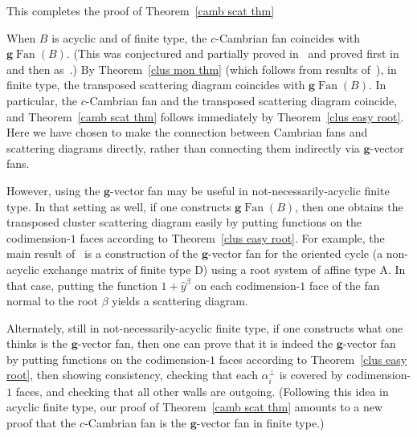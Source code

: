 \documentclass[ALCO,ThmDefs,Unicode,epreuves]{cedram}
\DeclareMathOperator{\Fan}{Fan}
\newcommand{\gFan}{\g\!\Fan}
\newcommand{\g}{\mathbf{g}}
\newcommand{\hy}{\hat{y}}
\begin{document}
This completes the proof of Theorem~\ref{camb scat thm}

\begin{rema}\label{g method}
When $B$ is acyclic and of finite type, the $c$-Cambrian fan coincides with $\gFan(B)$.
(This was conjectured and partially proved in~\cite[Section~10]{camb_fan} and proved first in~\cite{YZ} and then as~\cite[Corollary~5.16]{framework}.)
By Theorem~\ref{clus mon thm} (which follows from results of~\cite{GHKK}), in finite type, the transposed scattering diagram coincides with $\gFan(B)$.
In particular, the $c$-Cambrian fan and the transposed scattering diagram coincide, and Theorem~\ref{camb scat thm} follows immediately by Theorem~\ref{clus easy root}.
Here we have chosen to make the connection between Cambrian fans and scattering diagrams directly, rather than connecting them indirectly via $\g$-vector fans.

However, using the $\g$-vector fan may be useful in not-necessarily-acyclic finite type.
In that setting as well, if one constructs $\gFan(B)$, then one obtains the transposed cluster scattering diagram easily by putting functions on the codimension-$1$ faces according to Theorem~\ref{clus easy root}.
For example, the main result of~\cite{cyclica} is a construction of the $\g$-vector fan for the oriented cycle (a non-acyclic exchange matrix of finite type D) using a root system of affine type A.
In that case, putting the function $1+\hy^\beta$ on each codimension-$1$ face of the fan normal to the root $\beta$ yields a scattering diagram.

Alternately, still in not-necessarily-acyclic finite type, if one constructs what one thinks is the $\g$-vector fan, then one can prove that it is indeed the $\g$-vector fan by putting functions on the codimension-$1$ faces according to Theorem~\ref{clus easy root}, then showing consistency, checking that each $\alpha_i^\perp$ is covered by codimension-$1$ faces, and checking that all other walls are outgoing.
(Following this idea in acyclic finite type, our proof of Theorem~\ref{camb scat thm} amounts to a new proof that the $c$-Cambrian fan is the $\g$-vector fan in finite type.)
\end{rema}
\end{document}
